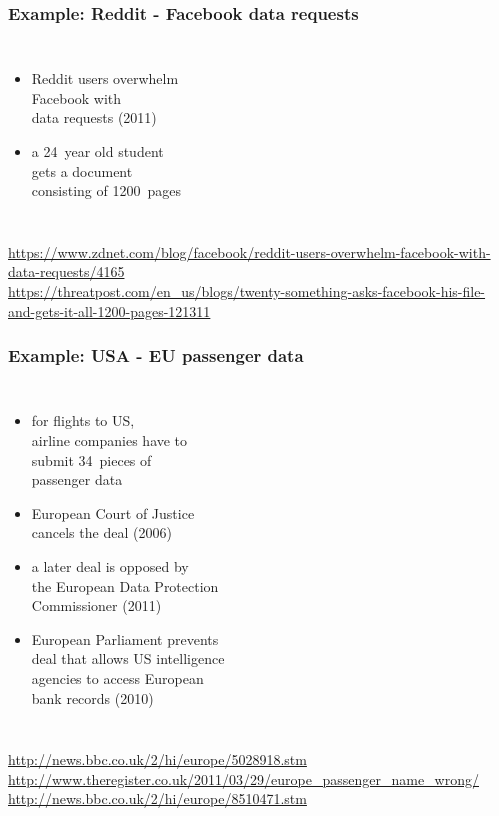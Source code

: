 \documentclass[dvipsnames]{beamer}
\theoremstyle{plain}
\begin{document}
\begin{frame}
  \frametitle{Example: Reddit - Facebook data requests}

  \begin{columns}

    \begin{itemize}
      \item Reddit users overwhelm\\
        Facebook with\\
        data requests (2011)
      \item a 24~year old student\\
        gets a document\\
        consisting of 1200~pages
    \end{itemize}
  \end{columns}

  \medskip
  \tiny{\url{https://www.zdnet.com/blog/facebook/reddit-users-overwhelm-facebook-with-data-requests/4165}}\\
  \tiny{\url{https://threatpost.com/en_us/blogs/twenty-something-asks-facebook-his-file-and-gets-it-all-1200-pages-121311}}\\
\end{frame}

\begin{frame}
  \frametitle{Example: USA - EU passenger data}

  \begin{columns}

    \begin{itemize}
      \item for flights to US,\\
        airline companies have to\\
        submit 34~pieces of\\
        passenger data
      \item European Court of Justice\\
        cancels the deal (2006)
      \item a later deal is opposed by\\
        the European Data Protection\\
        Commissioner (2011)

      \pause
      \item European Parliament prevents\\
        deal that allows US intelligence\\
        agencies to access European\\
        bank records (2010)
    \end{itemize}
  \end{columns}

  \medskip
  \tiny{\url{http://news.bbc.co.uk/2/hi/europe/5028918.stm}}\\
  \tiny{\url{http://www.theregister.co.uk/2011/03/29/europe_passenger_name_wrong/}}\\
  \tiny{\url{http://news.bbc.co.uk/2/hi/europe/8510471.stm}}\\
\end{frame}
\end{document}
